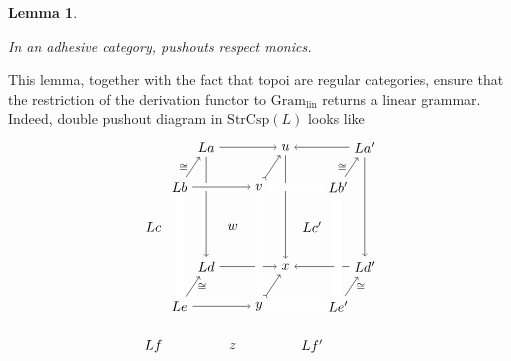 \documentclass{amsart}
\newcommand{\lin}{_{\t{lin}}}
\newcommand{\iso}{\cong}
\newcommand{\Gram}{\cat{Gram}}
\newcommand{\StrCsp}{\cat{StrCsp}}
\newcommand{\cat}[1]{\mathrm{#1}}
\renewcommand{\t}[1]{\text{#1}}
\newtheorem{lemma}[theorem]{Lemma}
\theoremstyle{remark}
\theoremstyle{definition}
\begin{document}
\begin{lemma} \label{thm:po-respect-monics}
  
  In an adhesive category, pushouts respect monics.

\end{lemma}

This lemma, together with the fact that topoi are regular categories, ensure that the restriction of the derivation functor to $
\Gram\lin $ returns a linear grammar. Indeed, double pushout diagram
in $ \StrCsp (L) $ looks like
%
\[
  \begin{tikzpicture}
    \node (1) at (1.33,5) {\( La \)};
    \node (2) at (3.33,5) {\( u \)};
    \node (3) at (5.33,5) {\( La' \)};
    \node (4) at (0.66,4) {\( Lb \)};
    \node (5) at (2.66,4) {\( v \)};
    \node (6) at (4.66,4) {\( Lb' \)};
    \node (7) at (0,3) {\( Lc \)};
    \node (8) at (2,3) {\( w \)};
    \node (9) at (4,3) {\( Lc' \)};
    \node (1') at (1.33,2) {\( Ld \)};
    \node (2') at (3.33,2) {\( x \)};
    \node (3') at (5.33,2) {\( Ld' \)};
    \node (4') at (0.66,1) {\( Le \)};
    \node (5') at (2.66,1) {\( y \)};
    \node (6') at (4.66,1) {\( Le' \)};
    \node (7') at (0,0) {\( Lf \)};
    \node (8') at (2,0) {\( z \)};
    \node (9') at (4,0) {\( Lf' \)};
    \draw [->] (1) to node [] {\scriptsize{\(  \)}} (2);
    \draw [->] (1') to node [] {\scriptsize{\(  \)}} (2');
    \draw [->] (3) to node [] {\scriptsize{\(  \)}} (2);
    \draw [->] (3') to node [] {\scriptsize{\(  \)}} (2');
    \draw [->] (1) to node [] {\scriptsize{\(  \)}} (1');
    \draw [->] (2) to node [] {\scriptsize{\(  \)}} (2');
    \draw [->] (3) to node [] {\scriptsize{\(  \)}} (3');
    \draw [->] (4) to node [left] {\scriptsize{\( \iso \)}} (1);
    \draw [->] (4') to node [right] {\scriptsize{\( \iso \)}} (1');
    \draw [>->] (5) to node [] {\scriptsize{\(  \)}} (2);
    \draw [>->] (5') to node [] {\scriptsize{\(  \)}} (2');
    \draw [->] (6) to node [left] {\scriptsize{\( \iso \)}} (3);
    \draw [->] (6') to node [right] {\scriptsize{\( \iso \)}} (3');
    \draw [white, line width=2mm] (4) -- (5);
    \draw [white, line width=2mm] (4') -- (5');
    \draw [white, line width=2mm] (6) -- (5);
    \draw [white, line width=2mm] (6') -- (5');
    \draw [white, line width=2mm] (4) -- (4');
    \draw [white, line width=2mm] (5) -- (5');
    \draw [white, line width=2mm] (6) -- (6');
    \draw [->] (4) to node [] {\scriptsize{\(  \)}} (5);
    \draw [->] (4') to node [] {\scriptsize{\(  \)}} (5');

\end{tikzpicture}\]
\end{document}
